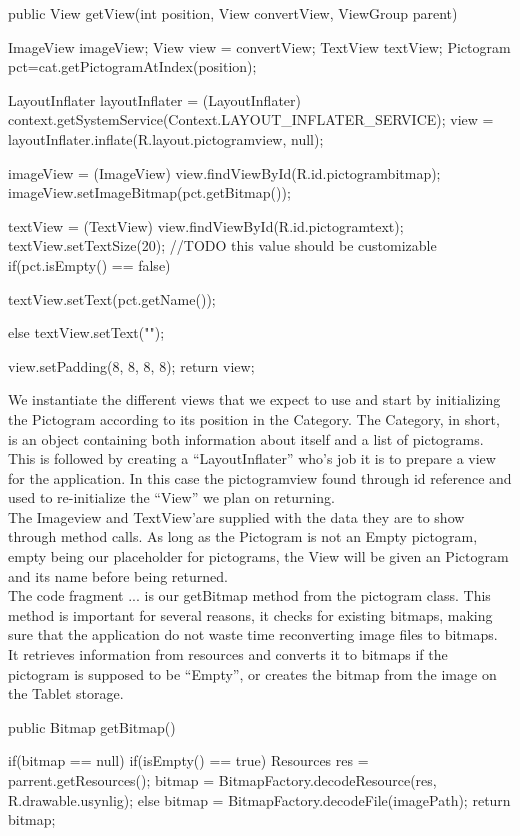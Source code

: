 \begin{source}{}
	public View getView(int position, View convertView, ViewGroup parent) 
	{
		ImageView imageView;
		View view = convertView;
		TextView textView;
		Pictogram pct=cat.getPictogramAtIndex(position);

		LayoutInflater layoutInflater = (LayoutInflater) context.getSystemService(Context.LAYOUT_INFLATER_SERVICE);
		view = layoutInflater.inflate(R.layout.pictogramview, null);

		imageView = (ImageView) view.findViewById(R.id.pictogrambitmap); 
		imageView.setImageBitmap(pct.getBitmap());

		textView = (TextView) view.findViewById(R.id.pictogramtext);
		textView.setTextSize(20);	//TODO this value should be customizable
		if(pct.isEmpty() == false)
		{

			textView.setText(pct.getName());
		}
		else
		{
			textView.setText("");
		}

		view.setPadding(8, 8, 8, 8);
		return view;
	}
\end{source}
We instantiate the different views that we expect to use and start by initializing the Pictogram according to its position in the Category.
The Category, in short, is an object containing both information about itself and a list of pictograms.
This is followed by creating a ``LayoutInflater'' who's job it is to prepare a view for the application.
In this case the pictogramview found through id reference and used to re-initialize the ``View'' we plan on returning.\\
The Imageview and TextView'are supplied with the data they are to show through method calls. 
As long as the Pictogram is not an Empty pictogram, empty being our placeholder for pictograms, the View will be given an Pictogram and its name before being returned.\\

The code fragment ... is our getBitmap method from the pictogram class.
This method is important for several reasons, it checks for existing bitmaps, making sure that the application do not waste time reconverting image files to bitmaps.
It retrieves information from resources and converts it to bitmaps if the pictogram is supposed to be ``Empty'', or creates the bitmap from the image on the Tablet storage.

\begin{source}{}
	public Bitmap getBitmap()
	{
		if(bitmap == null)
		{
			if(isEmpty() == true)
			{
				Resources res = parrent.getResources();
				bitmap = BitmapFactory.decodeResource(res, R.drawable.usynlig);
			}
			else
			{
				bitmap = BitmapFactory.decodeFile(imagePath);
			}
		}
		return bitmap;
	
	}
\end{source}


